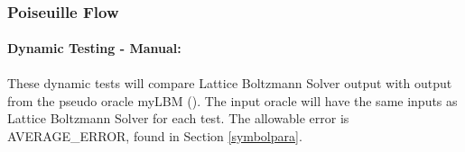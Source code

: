 \documentclass[12pt, titlepage]{article}
\newcommand{\myprogname}{Lattice Boltzmann Solver}
\begin{document}
\begin{enumerate}
\end{enumerate}
~\newpage

\subsubsection{Poiseuille Flow}
\label{frpf}

\paragraph{Dynamic Testing - Manual:}
\paragraph{} These dynamic tests will compare {\myprogname} output with output from the pseudo oracle myLBM (\citet{pylbmcode}). The input oracle will have the same inputs as {\myprogname} for each test. The allowable error is AVERAGE\_ERROR, found in Section \ref{symbolpara}.
\end{document}
